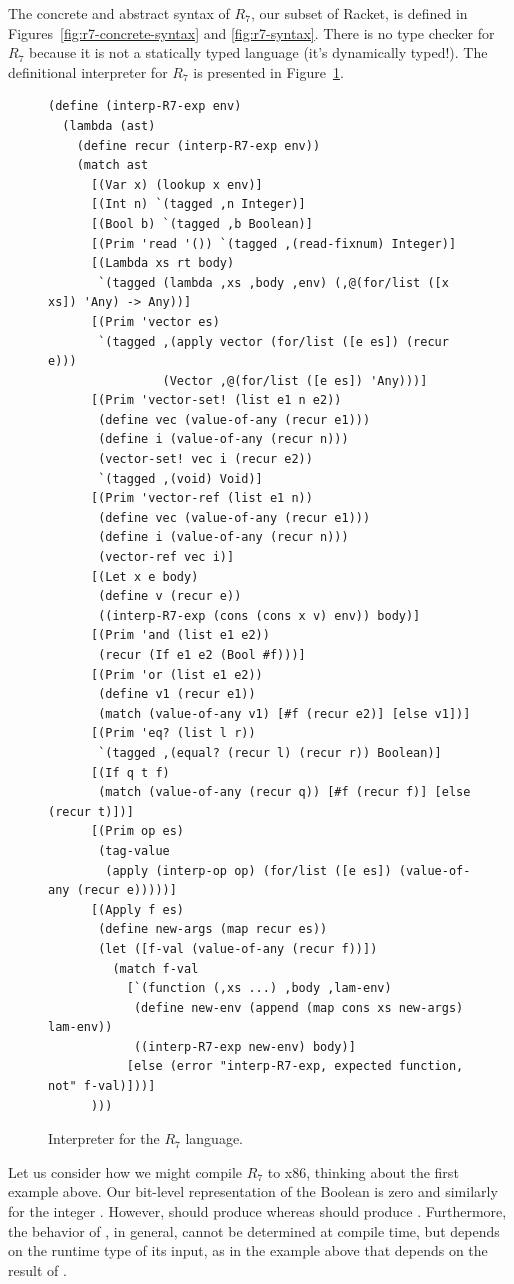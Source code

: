 \documentclass[11pt]{book}
\begin{document}
The concrete and abstract syntax of $R_7$, our subset of Racket, is
defined in Figures~\ref{fig:r7-concrete-syntax} and
\ref{fig:r7-syntax}.
%
There is no type checker for $R_7$ because it is not a statically
typed language (it's dynamically typed!).
%
The definitional interpreter for $R_7$ is presented in
Figure~\ref{fig:interp-R7}.

\begin{figure}[tbp]
\begin{lstlisting}[basicstyle=\ttfamily\footnotesize]
(define (interp-R7-exp env)
  (lambda (ast)
    (define recur (interp-R7-exp env))
    (match ast
      [(Var x) (lookup x env)]
      [(Int n) `(tagged ,n Integer)]
      [(Bool b) `(tagged ,b Boolean)]
      [(Prim 'read '()) `(tagged ,(read-fixnum) Integer)]
      [(Lambda xs rt body)
       `(tagged (lambda ,xs ,body ,env) (,@(for/list ([x xs]) 'Any) -> Any))]
      [(Prim 'vector es)
       `(tagged ,(apply vector (for/list ([e es]) (recur e)))
                (Vector ,@(for/list ([e es]) 'Any)))]
      [(Prim 'vector-set! (list e1 n e2))
       (define vec (value-of-any (recur e1)))
       (define i (value-of-any (recur n)))
       (vector-set! vec i (recur e2))
       `(tagged ,(void) Void)]
      [(Prim 'vector-ref (list e1 n))
       (define vec (value-of-any (recur e1)))
       (define i (value-of-any (recur n)))
       (vector-ref vec i)]
      [(Let x e body)
       (define v (recur e))
       ((interp-R7-exp (cons (cons x v) env)) body)]
      [(Prim 'and (list e1 e2))
       (recur (If e1 e2 (Bool #f)))]
      [(Prim 'or (list e1 e2))
       (define v1 (recur e1))
       (match (value-of-any v1) [#f (recur e2)] [else v1])]
      [(Prim 'eq? (list l r))
       `(tagged ,(equal? (recur l) (recur r)) Boolean)]
      [(If q t f)
       (match (value-of-any (recur q)) [#f (recur f)] [else (recur t)])]
      [(Prim op es)
       (tag-value
        (apply (interp-op op) (for/list ([e es]) (value-of-any (recur e)))))]
      [(Apply f es)
       (define new-args (map recur es))
       (let ([f-val (value-of-any (recur f))])
         (match f-val 
           [`(function (,xs ...) ,body ,lam-env)
            (define new-env (append (map cons xs new-args) lam-env))
            ((interp-R7-exp new-env) body)]
           [else (error "interp-R7-exp, expected function, not" f-val)]))]
      )))
\end{lstlisting}
\caption{Interpreter for the $R_7$ language.}
\label{fig:interp-R7}
\end{figure}


Let us consider how we might compile $R_7$ to x86, thinking about the
first example above. Our bit-level representation of the Boolean
 is zero and similarly for the integer .  However,
 should produce  whereas 
should produce . Furthermore, the behavior of , in
general, cannot be determined at compile time, but depends on the
runtime type of its input, as in the example above that depends on the
result of .
\end{document}
